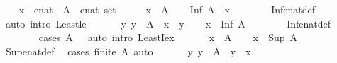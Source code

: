 \begin{isabellebody}
\isanewline
%
\isadelimproof
%
\endisadelimproof
%
\isatagproof
{}\isamarkupfalse%
\isanewline
\ \ \isamarkupfalse%
\ x\ {\isacharcolon}{\isacharcolon}\ {\isachardoublequoteopen}enat{\isachardoublequoteclose}\ \ A\ {\isacharcolon}{\isacharcolon}\ {\isachardoublequoteopen}enat\ set{\isachardoublequoteclose}\isanewline
\ \ \isacommand{{\isacharbraceleft}}\isamarkupfalse%
\ \isamarkupfalse%
\ {\isachardoublequoteopen}x\ {\isasymin}\ A{\isachardoublequoteclose}\ \isamarkupfalse%
\ \isamarkupfalse%
\ {\isachardoublequoteopen}Inf\ A\ {\isasymle}\ x{\isachardoublequoteclose}\isanewline
\ \ \ \ \ \ \isamarkupfalse%
\ Inf{\isacharunderscore}enat{\isacharunderscore}def\ \isamarkupfalse%
\ {\isacharparenleft}auto\ intro{\isacharcolon}\ Least{\isacharunderscore}le{\isacharparenright}\ \isacommand{{\isacharbraceright}}\isamarkupfalse%
\isanewline
\ \ \isacommand{{\isacharbraceleft}}\isamarkupfalse%
\ \isamarkupfalse%
\ {\isachardoublequoteopen}{\isasymAnd}y{\isachardot}\ y\ {\isasymin}\ A\ {\isasymLongrightarrow}\ x\ {\isasymle}\ y{\isachardoublequoteclose}\ \isamarkupfalse%
\ \isamarkupfalse%
\ {\isachardoublequoteopen}x\ {\isasymle}\ Inf\ A{\isachardoublequoteclose}\isanewline
\ \ \ \ \ \ \isamarkupfalse%
\ Inf{\isacharunderscore}enat{\isacharunderscore}def\isanewline
\ \ \ \ \ \ \isamarkupfalse%
\ {\isacharparenleft}cases\ {\isachardoublequoteopen}A\ {\isacharequal}\ {\isacharbraceleft}{\isacharbraceright}{\isachardoublequoteclose}{\isacharparenright}\ {\isacharparenleft}auto\ intro{\isacharcolon}\ LeastI{}{\isacharunderscore}ex{\isacharparenright}\ \isacommand{{\isacharbraceright}}\isamarkupfalse%
\isanewline
\ \ \isacommand{{\isacharbraceleft}}\isamarkupfalse%
\ \isamarkupfalse%
\ {\isachardoublequoteopen}x\ {\isasymin}\ A{\isachardoublequoteclose}\ \isamarkupfalse%
\ \isamarkupfalse%
\ {\isachardoublequoteopen}x\ {\isasymle}\ Sup\ A{\isachardoublequoteclose}\isanewline
\ \ \ \ \ \ \isamarkupfalse%
\ Sup{\isacharunderscore}enat{\isacharunderscore}def\ \isamarkupfalse%
\ {\isacharparenleft}cases\ {\isachardoublequoteopen}finite\ A{\isachardoublequoteclose}{\isacharparenright}\ auto\ \isacommand{{\isacharbraceright}}\isamarkupfalse%
\isanewline
\ \ \isacommand{{\isacharbraceleft}}\isamarkupfalse%
\ \isamarkupfalse%
\ {\isachardoublequoteopen}{\isasymAnd}y{\isachardot}\ y\ {\isasymin}\ A\ {\isasymLongrightarrow}\ y\ {\isasymle}\ x{\isachardoublequoteclose}\ \isamarkupfalse%

\end{isabellebody}
